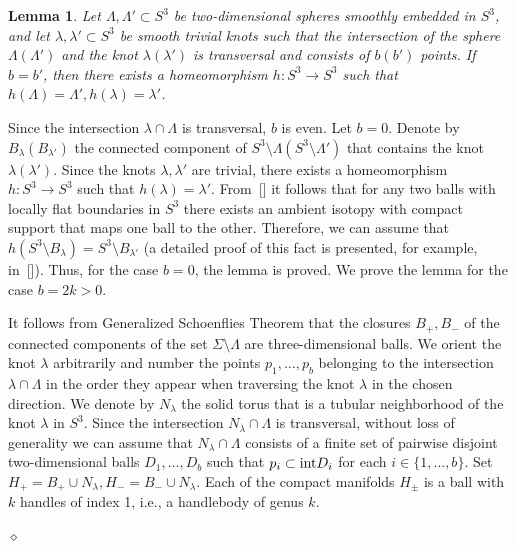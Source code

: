 \documentclass[%
 aip,
 amsmath,amssymb,
preprint,%
]{revtex4-1}
\newtheorem{lemma}{Lemma}[section]
\newenvironment{proof}{{\bf Proof:}}
{\hfill $\diamond$\medskip}
\begin{document}
\begin{lemma}\label{cp2} Let $\Lambda, \Lambda'\subset S^3$ be two-dimensional spheres smoothly embedded in $S^3$, and let $\lambda, \lambda'\subset S^3$ be smooth trivial knots such that the intersection of the sphere $\Lambda (\Lambda')$ and the knot $\lambda (\lambda')$ is transversal and consists of $b (b')$ points. If $b=b'$, then there exists a homeomorphism $h: S^3\to S^3$ such that $h(\Lambda)=\Lambda', h(\lambda)=\lambda'$.
\end{lemma}
\begin{proof} Since the intersection $\lambda\cap \Lambda$ is transversal, $b$ is even. Let $b=0$. Denote by $B_{\lambda} (B_{\lambda'})$ the connected component of $S^3\setminus \Lambda (S^3\setminus \Lambda')$ that contains the knot $\lambda (\lambda')$. Since the knots $\lambda, \lambda'$ are trivial, there exists a homeomorphism $h: S^3\to S^3$ such that $h(\lambda)=\lambda'$. From~[] it follows that for any two balls with locally flat boundaries in $S^3$ there exists an ambient isotopy with compact support that maps one ball to the other. Therefore, we can assume that $h(S^3\setminus B_\lambda)=S^3\setminus B_{\lambda'}$ (a detailed proof of this fact is presented, for example, in~[]). Thus, for the case $b=0$, the lemma is proved. We prove the lemma for the case $b=2k>0$.

It follows from  Generalized Schoenflies Theorem that the closures $B_+, B_-$ of the connected components of the set $\Sigma\setminus \Lambda$ are three-dimensional balls.
We orient the knot $\lambda$ arbitrarily and number the points $p_1,\dots, p_b$ belonging to the intersection $\lambda\cap \Lambda$ in the order they appear when traversing the knot $\lambda$ in the chosen direction. We denote by $N_\lambda$ the solid torus that is a tubular neighborhood of the knot $\lambda$ in $S^3$. Since the intersection $N_\lambda\cap \Lambda$ is transversal, without loss of generality we can assume that $N_\lambda\cap \Lambda$ consists of a finite set of pairwise disjoint two-dimensional balls $D_1,\dots, D_b$ such that $p_i\subset {\rm int}D_i$ for each $i\in \{1,\dots, b\}$. Set $H_+=B_+\cup N_\lambda, H_-=B_-\cup N_\lambda$. Each of the compact manifolds $H_{\pm}$ is a ball with $k$ handles of index 1, i.e., a handlebody of genus $k$.


\end{proof}
\end{document}
